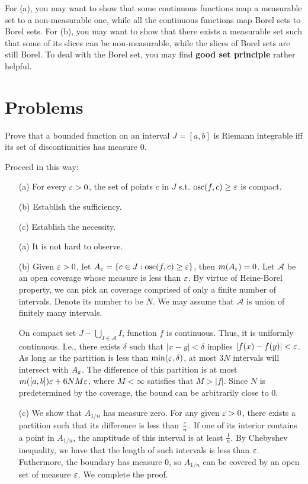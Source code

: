 \begin{hint}
  For (a), you may want to show that some continuous functions map a measurable set to a non-measurable one, while all the continuous functions map Borel sets to Borel sets.
  For (b), you may want to show that there exists a measurable set such that some of its slices can be non-measurable, while the slices of Borel sets are still Borel.
  To deal with the Borel set, you may find \textbf{good set principle} rather helpful.
\end{hint}

\section{Problems}
\begin{Problem}[4]
  Prove that a bounded function on an interval $J=[a,b]$ is Riemann integrable iff its set of discontinuities has measure 0. 
  
  Proceed in this way:
  \begin{itemize}
    \item [(a)] For every $\varepsilon>0$, the set of points $c$ in $J$ s.t. $\text{osc}(f,c)\geq\varepsilon$ is compact.
    \item [(b)] Establish the sufficiency.
    \item [(c)] Establish the necessity.
  \end{itemize}
\end{Problem}

\begin{Solution}
  \begin{itemize}
    \item [(a)] It is not hard to observe.
    \item [(b)] Given $\varepsilon>0$, let $A_\varepsilon=\{c\in J: \text{osc}(f,c)\geq\varepsilon\}$, then $m(A_\varepsilon)=0$. Let $\mathcal{A}$ be an open coverage whose measure is less than $\varepsilon$. By virtue of Heine-Borel property, we can pick an coverage comprised of only a finite number of intervals. Denote its number to be $N$. We may assume that $\mathcal{A}$ is union of finitely many intervals.
    
    On compact set $J-\bigcup_{I\in\mathcal{A}}I$, function $f$ is continuous. Thus, it is uniformly continuous. I.e., there exists $\delta$ such that $|x-y|<\delta$ implies $|f(x)-f(y)|<\varepsilon$.
    As long as the partition is less than $\min(\varepsilon,\delta)$, at most $3N$ intervals will intersect with $A_\varepsilon$. The difference of this partition is at most $m([a,b])\varepsilon+6NM\varepsilon$, where $M<\infty$ satisfies that $M>|f|$. Since $N$ is predetermined by the coverage, the bound can be arbitrarily close to 0.
    \item [(c)] We show that $A_{1/n}$ has measure zero. For any given $\varepsilon>0$, there exists a partition such that its difference is less than $\frac{\varepsilon}{n}$. If one of its interior contains a point in $A_{1/n}$, the amptitude of this interval is at least $\frac1n$. By Chebyshev inequality, we have that the length of such intervals is less than $\varepsilon$. Futhermore, the boundary has measure 0, so $A_{1/n}$ can be covered by an open set of measure $\varepsilon$. We complete the proof.
  \end{itemize} 
\end{Solution}


